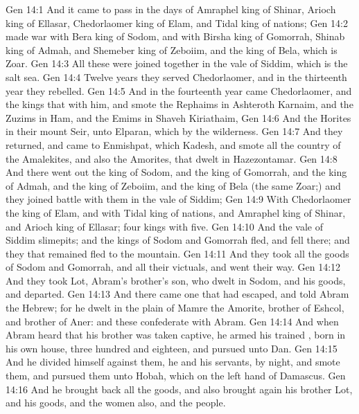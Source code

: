 \vs Gen 14:1 And it came to pass in the days of Amraphel king of Shinar, Arioch king of Ellasar, Chedorlaomer king of Elam, and Tidal king of nations;
\vs Gen 14:2  made war with Bera king of Sodom, and with Birsha king of Gomorrah, Shinab king of Admah, and Shemeber king of Zeboiim, and the king of Bela, which is Zoar.
\vs Gen 14:3 All these were joined together in the vale of Siddim, which is the salt sea.
\vs Gen 14:4 Twelve years they served Chedorlaomer, and in the thirteenth year they rebelled.
\vs Gen 14:5 And in the fourteenth year came Chedorlaomer, and the kings that  with him, and smote the Rephaims in Ashteroth Karnaim, and the Zuzims in Ham, and the Emims in Shaveh Kiriathaim,
\vs Gen 14:6 And the Horites in their mount Seir, unto Elparan, which  by the wilderness.
\vs Gen 14:7 And they returned, and came to Enmishpat, which  Kadesh, and smote all the country of the Amalekites, and also the Amorites, that dwelt in Hazezontamar.
\vs Gen 14:8 And there went out the king of Sodom, and the king of Gomorrah, and the king of Admah, and the king of Zeboiim, and the king of Bela (the same  Zoar;) and they joined battle with them in the vale of Siddim;
\vs Gen 14:9 With Chedorlaomer the king of Elam, and with Tidal king of nations, and Amraphel king of Shinar, and Arioch king of Ellasar; four kings with five.
\vs Gen 14:10 And the vale of Siddim  slimepits; and the kings of Sodom and Gomorrah fled, and fell there; and they that remained fled to the mountain.
\vs Gen 14:11 And they took all the goods of Sodom and Gomorrah, and all their victuals, and went their way.
\vs Gen 14:12 And they took Lot, Abram's brother's son, who dwelt in Sodom, and his goods, and departed.
\vs Gen 14:13 And there came one that had escaped, and told Abram the Hebrew; for he dwelt in the plain of Mamre the Amorite, brother of Eshcol, and brother of Aner: and these  confederate with Abram.
\vs Gen 14:14 And when Abram heard that his brother was taken captive, he armed his trained , born in his own house, three hundred and eighteen, and pursued  unto Dan.
\vs Gen 14:15 And he divided himself against them, he and his servants, by night, and smote them, and pursued them unto Hobah, which  on the left hand of Damascus.
\vs Gen 14:16 And he brought back all the goods, and also brought again his brother Lot, and his goods, and the women also, and the people.
